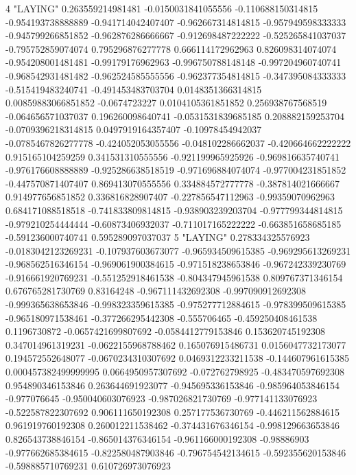 4 "LAYING" 0.263559214981481 -0.0150031841055556 -0.110688150314815 -0.954193738888889 -0.941714042407407 -0.962667314814815 -0.957949598333333 -0.945799266851852 -0.962876286666667 -0.912698487222222 -0.525265841037037 -0.795752859074074 0.795296876277778 0.666114172962963 0.826098314074074 -0.954208001481481 -0.99179176962963 -0.996750788148148 -0.997204960740741 -0.968542931481482 -0.962524585555556 -0.962377354814815 -0.347395084333333 -0.515419483240741 -0.491453483703704 0.0148351366314815 0.00859883066851852 -0.0674723227 0.0104105361851852 0.256938767568519 -0.064656571037037 0.196260098640741 -0.0531531839685185 0.208882159253704 -0.0709396218314815 0.0497919164357407 -0.10978454942037 -0.0785467826277778 -0.424052053055556 -0.048102286662037 -0.420664662222222 0.915165104259259 0.341531310555556 -0.921199965925926 -0.969816635740741 -0.976176608888889 -0.925286638518519 -0.971696884074074 -0.977004231851852 -0.447570871407407 0.869413070555556 0.334884572777778 -0.387814021666667 0.914977656851852 0.336816828907407 -0.227856547112963 -0.99359070962963 0.684171088518518 -0.741833809814815 -0.938903239203704 -0.977799344814815 -0.979210254444444 -0.60873406932037 -0.711017165222222 -0.663851658685185 -0.591236000740741 0.595289097037037
5 "LAYING" 0.278334325576923 -0.0183042123269231 -0.107937603673077 -0.965934509615385 -0.969295613269231 -0.968562516346154 -0.969061900384615 -0.971518238653846 -0.967242339230769 -0.916661920769231 -0.551252918461538 -0.804347945961538 0.809767371346154 0.676765281730769 0.83164248 -0.967111432692308 -0.997090912692308 -0.999365638653846 -0.998323359615385 -0.975277712884615 -0.978399509615385 -0.965180971538461 -0.377266295442308 -0.555706465 -0.459250408461538 0.1196730872 -0.0657421699807692 -0.0584412779153846 0.153620745192308 0.347014961319231 -0.0622155968788462 0.165076915486731 0.0156047732173077 0.194572552648077 -0.0670234310307692 0.0469312233211538 -0.144607961615385 0.000457382499999995 0.0664950957307692 -0.072762798925 -0.483470597692308 0.954890346153846 0.263644691923077 -0.945695336153846 -0.985964053846154 -0.977076645 -0.950040603076923 -0.987026821730769 -0.977141133076923 -0.522587822307692 0.906111650192308 0.257177536730769 -0.446211562884615 0.961919760192308 0.260012211538462 -0.374431676346154 -0.998129663653846 0.826543738846154 -0.865014376346154 -0.961166000192308 -0.98886903 -0.977662685384615 -0.822580487903846 -0.796754542134615 -0.592355620153846 -0.598885710769231 0.610726973076923
